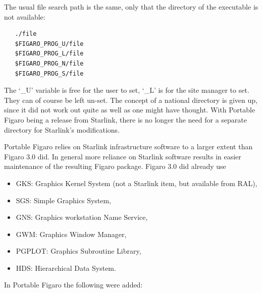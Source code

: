    The usual file search path is the same, only that the directory of
   the executable is not available:

\begin{verbatim}
   ./file
   $FIGARO_PROG_U/file
   $FIGARO_PROG_L/file
   $FIGARO_PROG_N/file
   $FIGARO_PROG_S/file
\end{verbatim}

   The `\_U' variable is free for the user to set, `\_L' is for the site
   manager to set. They can of course be left un-set.  The concept of a
   national directory is given up, since it did not work out quite as
   well as one might have thought. With Portable Figaro being a release
   from Starlink, there is no longer the need for a separate directory
   for Starlink's modifications.

   Portable Figaro relies on Starlink infrastructure software to a
   larger extent than Figaro 3.0 did.  In general more reliance on
   Starlink software results in easier maintenance of the resulting
   Figaro package. Figaro 3.0 did already use

\begin{itemize}
\item GKS: Graphics Kernel System (not a Starlink item, but available from RAL),
\item SGS: Simple Graphics System,
\item GNS: Graphics workstation Name Service,
\item GWM: Graphics Window Manager,
\item PGPLOT: Graphics Subroutine Library,
\item HDS: Hierarchical Data System.
\end{itemize}

In Portable Figaro the following were added:

